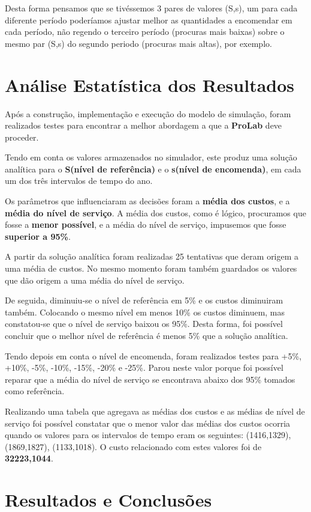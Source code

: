 \documentclass[a4paper]{article}
\begin{document}
Desta forma pensamos que se tivéssemos 3 pares de valores (S,s), um para cada diferente período poderíamos ajustar melhor as quantidades a encomendar em cada período, não regendo o terceiro período (procuras mais baixas) sobre o mesmo par (S,s) do segundo periodo (procuras mais altas), por exemplo.


\section{Análise Estatística dos Resultados}

Após a construção, implementação e execução do modelo de simulação, foram realizados testes para encontrar a melhor abordagem a que a \textbf{ProLab} deve proceder.

Tendo em conta os valores armazenados no simulador, este produz uma solução analítica para o \textbf{S(nível de referência)} e o \textbf{s(nível de encomenda)}, em cada um dos três intervalos de tempo do ano.

Os parâmetros que influenciaram as decisões foram a \textbf{média dos custos}, e a \textbf{média do nível de serviço}. A média dos custos, como é lógico, procuramos que fosse a \textbf{menor possível}, e a média do nível de serviço, impusemos que fosse \textbf{superior a 95\%}.

A partir da solução analítica foram realizadas 25 tentativas que deram origem a uma média de custos. No mesmo momento foram também guardados os valores que dão origem a uma média do nível de serviço.

De seguida, diminuiu-se o nível de referência em 5\% e os custos diminuiram também. Colocando o mesmo nível em menos 10\% os custos diminuem, mas constatou-se que o nível de serviço baixou os 95\%. Desta forma, foi possível concluir que o melhor nível de referência é menos 5\% que a solução analítica.

Tendo depois em conta o nível de encomenda, foram realizados testes para +5\%, +10\%, -5\%, -10\%, -15\%, -20\% e -25\%. Parou neste valor porque foi possível reparar que a média do nível de serviço se encontrava abaixo dos 95\% tomados como referência.

Realizando uma tabela que agregava as médias dos custos e as médias de nível de serviço foi possível constatar que o menor valor das médias dos custos ocorria quando os valores para os intervalos de tempo eram os seguintes: (1416,1329), (1869,1827), (1133,1018). O custo relacionado com estes valores foi de \textbf{32223,1044}.


\section{Resultados e Conclusões}
\label{sec:conclusao}
\end{document}
